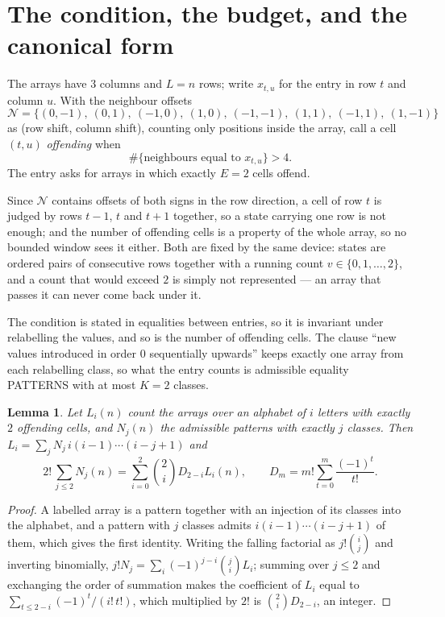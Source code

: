 \documentclass[11pt,a4paper]{article}
\theoremstyle{plain}
\newtheorem{lemma}[theorem]{Lemma}
\theoremstyle{definition}
\begin{document}
\section{The condition, the budget, and the canonical form}

The arrays have $3$ columns and $L=n$ rows; write $x_{t,u}$ for the entry in
row $t$ and column $u$. With the neighbour offsets
\[
\mathcal N=\{(0,-1),\ (0,1),\ (-1,0),\ (1,0),\ (-1,-1),\ (1,1),\ (-1,1),\ (1,-1)\}
\]
as (row shift, column shift), counting only positions inside the array, call a cell
$(t,u)$ \emph{offending} when
\[
\#\{\text{neighbours equal to }x_{t,u}\}>4 .
\]
The entry asks for arrays in which exactly $E=2$ cells offend.

Since $\mathcal N$ contains offsets of both signs in the row direction, a cell of row
$t$ is judged by rows $t-1$, $t$ and $t+1$ together, so a state carrying one row is not
enough; and the number of offending cells is a property of the whole array, so no bounded
window sees it either. Both are fixed by the same device: states are ordered pairs of
consecutive rows together with a running count $v\in\{0,1,\dots,2\}$, and a count that
would exceed $2$ is simply not represented --- an array that passes it can never come back
under it.

The condition is stated in equalities between entries, so it is invariant under relabelling
the values, and so is the number of offending cells. The clause ``new values introduced in
order $0$ sequentially upwards'' keeps exactly one array from each relabelling class, so what
the entry counts is admissible equality PATTERNS with at most $K=2$ classes.

\begin{lemma}\label{lem:inv}
Let $L_i(n)$ count the arrays over an alphabet of $i$ letters with exactly $2$ offending
cells, and $N_j(n)$ the admissible patterns with exactly $j$ classes. Then
$L_i=\sum_j N_j\,i(i-1)\cdots(i-j+1)$ and
\[
2!\,\sum_{j\le2}N_j(n)=\sum_{i=0}^{2}\binom{2}{i}D_{2-i}L_i(n),
\qquad D_m=m!\sum_{t=0}^{m}\frac{(-1)^t}{t!} .
\]
\end{lemma}

\begin{proof}
A labelled array is a pattern together with an injection of its classes into the alphabet,
and a pattern with $j$ classes admits $i(i-1)\cdots(i-j+1)$ of them, which gives the first
identity. Writing the falling factorial as $j!\binom{i}{j}$ and inverting binomially,
$j!N_j=\sum_i(-1)^{j-i}\binom{j}{i}L_i$; summing over $j\le2$ and exchanging the
order of summation makes the coefficient of $L_i$ equal to
$\sum_{t\le2-i}(-1)^t/(i!\,t!)$, which multiplied by $2!$ is
$\binom{2}{i}D_{2-i}$, an integer.
\end{proof}
\end{document}
